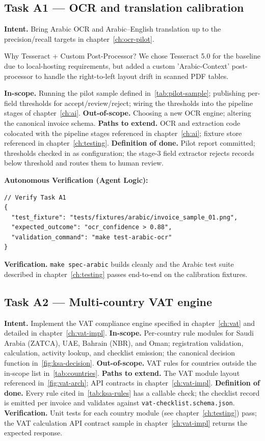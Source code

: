 \subsection*{Task A1 --- OCR and translation calibration}
\textbf{Intent.} Bring Arabic OCR and Arabic--English translation up
to the precision/recall targets in chapter~\ref{ch:ocr-pilot}.

\begin{adrbox}{Why Tesseract + Custom Post-Processor?}
We chose Tesseract 5.0 for the baseline due to local-hosting requirements, but added a custom 'Arabic-Context' post-processor to handle the right-to-left layout drift in scanned PDF tables.
\end{adrbox}

\textbf{In-scope.} Running the pilot sample defined
in~\ref{tab:pilot-sample}; publishing per-field thresholds for
accept/review/reject; wiring the thresholds into the pipeline stages
of chapter~\ref{ch:ai}.
\textbf{Out-of-scope.} Choosing a new OCR engine; altering the
canonical invoice schema.
\textbf{Paths to extend.} OCR and extraction code colocated with the
pipeline stages referenced in chapter~\ref{ch:ai}; fixture store
referenced in chapter~\ref{ch:testing}.
\textbf{Definition of done.} Pilot report committed; thresholds
checked in as configuration; the stage-3 field extractor rejects
records below threshold and routes them to human review.

\textbf{Autonomous Verification (Agent Logic):}
\begin{lstlisting}[language=jsonx]
// Verify Task A1
{
  "test_fixture": "tests/fixtures/arabic/invoice_sample_01.png",
  "expected_outcome": "ocr_confidence > 0.88",
  "validation_command": "make test-arabic-ocr"
}
\end{lstlisting}

\textbf{Verification.} \texttt{make spec-arabic} builds cleanly and
the Arabic test suite described in chapter~\ref{ch:testing} passes
end-to-end on the calibration fixtures.

\subsection*{Task A2 --- Multi-country VAT engine}
\textbf{Intent.} Implement the VAT compliance engine specified in
chapter~\ref{ch:vat} and detailed in chapter~\ref{ch:vat-impl}.
\textbf{In-scope.} Per-country rule modules for Saudi Arabia (ZATCA),
UAE, Bahrain (NBR), and Oman; registration validation, calculation,
activity lookup, and checklist emission; the canonical decision
function in~\ref{fig:ksa-decision}.
\textbf{Out-of-scope.} VAT rules for countries outside the in-scope
list in~\ref{tab:countries}.
\textbf{Paths to extend.} The VAT module layout referenced
in~\ref{fig:vat-arch}; API contracts in chapter~\ref{ch:vat-impl}.
\textbf{Definition of done.} Every rule cited
in~\ref{tab:ksa-rules} has a callable check; the checklist record is
emitted per invoice and validates against
\texttt{vat-checklist.schema.json}.
\textbf{Verification.} Unit tests for each country module (see
chapter~\ref{ch:testing}) pass; the VAT calculation API contract
sample in chapter~\ref{ch:vat-impl} returns the expected response.

